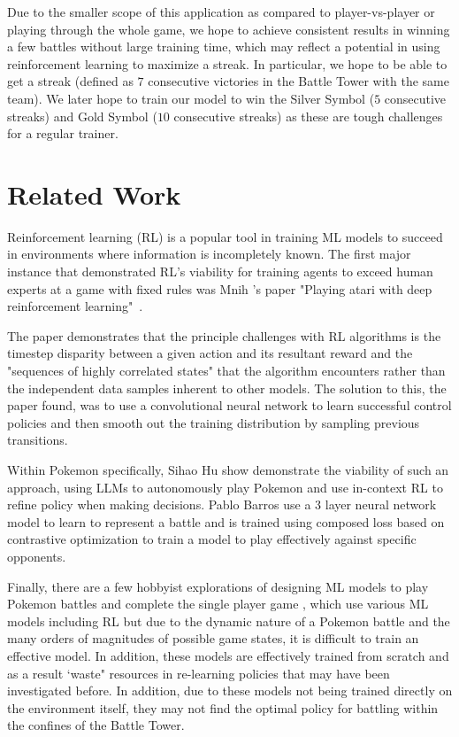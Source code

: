 \documentclass[10pt,twocolumn,letterpaper]{article}
\begin{document}
Due to the smaller scope of this application as compared to player-vs-player or playing through the whole game,
we hope to achieve consistent results in winning a few battles without large training time,
which may reflect a potential in using reinforcement learning to maximize a streak. In particular, we hope to be able to get a streak (defined as $7$ consecutive victories in the Battle Tower with the same team). We later hope to train our model to win the Silver Symbol ($5$ consecutive streaks) and Gold Symbol ($10$ consecutive streaks) as these are tough challenges for a regular trainer.

\section{Related Work}

\par{Reinforcement learning (RL) is a popular tool in training ML models to succeed in environments where information is incompletely known. The first major instance that demonstrated RL's viability for training agents to exceed human experts at a game with fixed rules was Mnih \etal's paper "Playing atari with deep reinforcement learning"~\cite{Mnih}.}
\par{The paper demonstrates that the principle challenges with RL algorithms is the timestep disparity between a given action and its resultant reward and the "sequences of highly correlated states" that the algorithm encounters rather than the independent data samples inherent to other models. The solution to this, the paper found, was to use a convolutional neural network to learn successful control policies and then smooth out the training distribution by sampling previous transitions.}
\par{Within Pokemon specifically, Sihao Hu \etal \cite{Hu} show demonstrate the viability of such an approach, using LLMs to autonomously play Pokemon and use in-context RL to refine policy when making decisions. Pablo Barros \etal \cite{Barros} use a 3 layer neural network model to learn to represent a battle and is trained using composed loss based on contrastive optimization to train a model to play effectively against specific opponents.}
\par{Finally, there are a few hobbyist explorations of designing ML models to play Pokemon battles \cite{Whiddy} and complete the single player game \cite{Compton}, which use various ML models including RL but due to the dynamic nature of a Pokemon battle and the many orders of magnitudes of possible game states, it is difficult to train an effective model. In addition, these models are effectively trained from scratch and as a result `waste" resources in re-learning policies that may have been investigated before. In addition, due to these models not being trained directly on the environment itself, they may not find the optimal policy for battling within the confines of the Battle Tower.}
\end{document}
